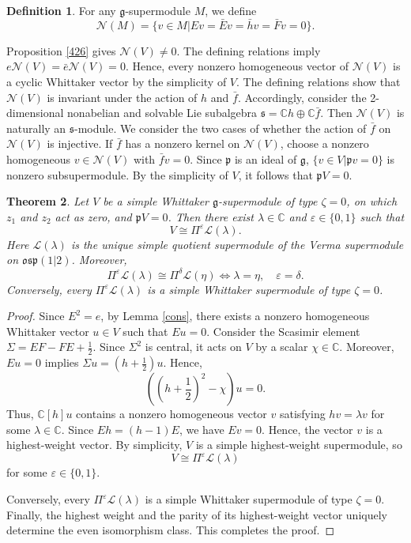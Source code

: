 \documentclass[a4paper,10pt]{article}
\theoremstyle{definition}
\newtheorem{definition}{Definition}[section]
\theoremstyle{plain}
\newtheorem{theorem}[definition]{Theorem}
\theoremstyle{remark}
\theoremstyle{mystyle}
\numberwithin{equation}{section}
\begin{document}
\begin{definition}
    For any $\mathfrak g$-supermodule $M$, we define 
    $$
        \mathcal N(M)=\{v\in M|Ev=\bar Ev=\bar hv=\bar Fv=0\}.
    $$
\end{definition}
Proposition \ref{426} gives $\mathcal N(V)\neq 0$. The defining relations imply $e\mathcal N(V)=\bar e\mathcal N(V)=0$. Hence, every nonzero homogeneous vector of $\mathcal N(V)$ is a cyclic Whittaker vector by the simplicity of $V$.
The defining relations show that \(\mathcal N(V)\) is invariant under the action of \(h\) and \(\bar f\). Accordingly, consider the 2-dimensional nonabelian and solvable Lie subalgebra $\mathfrak s=\mathbb Ch\oplus\mathbb C\bar f.$ Then \(\mathcal N(V)\) is naturally an \(\mathfrak s\)-module. We consider the two cases of whether the action of \(\bar f\) on \(\mathcal N(V)\) is injective.
If \(\bar f\) has a nonzero kernel on \(\mathcal N(V)\), choose a nonzero homogeneous \(v\in \mathcal N(V)\) with \(\bar fv=0\). Since \(\mathfrak p\) is an ideal of \(\mathfrak g\), $\{v\in V|\mathfrak pv=0\}$ is nonzero subsupermodule. By the simplicity of $V$, it follows that \(\mathfrak pV=0\).
\begin{theorem}\label{0osp}
    Let $V$ be a simple Whittaker $\mathfrak g$-supermodule of type $\zeta=0$, on which $z_1$ and $z_2$ act as zero, and $\mathfrak pV=0$. Then there exist $\lambda\in \mathbb C$ and $\varepsilon\in \{0,1\}$ such that
    $$
    V\cong \Pi^{\varepsilon}\mathcal L(\lambda).
    $$
    Here $\mathcal L(\lambda)$ is the unique simple quotient supermodule of the Verma supermodule on $\mathfrak{osp}(1|2)$.
    Moreover,
    \[
    \Pi^\varepsilon \mathcal L(\lambda)\cong\Pi^\delta \mathcal L(\eta)\iff\lambda=\eta,\quad \varepsilon=\delta.
    \]
    Conversely, every \(\Pi^\varepsilon \mathcal L(\lambda)\) is a simple Whittaker supermodule of type \(\zeta=0\).
\end{theorem}
\begin{proof}
    Since $E^2=e$, by Lemma \ref{cons}, there exists a nonzero homogeneous Whittaker vector \(u\in V\) such that \(Eu=0\). Consider the Scasimir element $\Sigma=EF-FE+\frac{1}{2}$. Since \(\Sigma^2\) is central, it acts on \(V\) by a scalar \(\chi\in\mathbb C\). Moreover, \(Eu=0\) implies $\Sigma u=\left(h+\frac12\right)u$. Hence,
    \[
        ((h+\frac12)^2-\chi)u=0.
    \]
    Thus, \(\mathbb C[h]u\) contains a nonzero homogeneous vector \(v\) satisfying \(hv=\lambda v\) for some \(\lambda\in\mathbb C\). Since $Eh=(h-1)E$, we have \(Ev=0\). Hence, the vector \(v\) is a highest-weight vector. By simplicity, \(V\) is a simple highest-weight supermodule, so
    \[
        V\cong\Pi^\varepsilon \mathcal L(\lambda)
    \]
    for some \(\varepsilon\in\{0,1\}\).

    Conversely, every \(\Pi^\varepsilon \mathcal L(\lambda)\) is a simple Whittaker supermodule of type \(\zeta=0\). Finally, the highest weight and the parity of its highest-weight vector uniquely determine the even isomorphism class. This completes the proof.
\end{proof}
\end{document}
